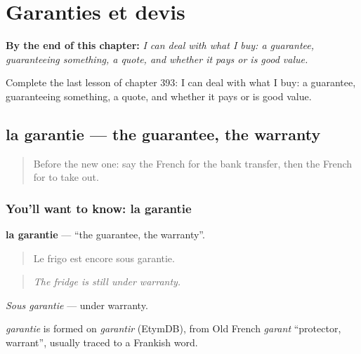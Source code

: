 
\chapter{Garanties et devis}
\label{ch:fr-garanties-et-devis}

\begin{chapteropening}
\textbf{By the end of this chapter:} \emph{I can deal with what I buy: a guarantee, guaranteeing something, a quote, and whether it pays or is good value.}

Complete the last lesson of chapter 393: I can deal with what I buy: a guarantee, guaranteeing something, a quote, and whether it pays or is good value.
\end{chapteropening}

\section[la garantie]{la garantie — the guarantee, the warranty}

\label{lesson:FR-C393-garantie}



\begin{quote}
Before the new one: say the French for the bank transfer, then the French for to take out.
\end{quote}

\subsection*{You'll want to know: la garantie}
\textbf{la garantie} — \textquotedblleft{}the guarantee, the warranty\textquotedblright{}.

\begin{quote}
Le frigo est encore sous garantie.
\end{quote}

\begin{quote}
\emph{The fridge is still under warranty.}
\end{quote}

\emph{Sous garantie} — under warranty.

\begin{cousinweb}
\emph{garantie} is formed on \emph{garantir} (EtymDB), from Old French \emph{garant} \textquotedblleft{}protector, warrant\textquotedblright{}, usually traced to a Frankish word.
\end{cousinweb}

